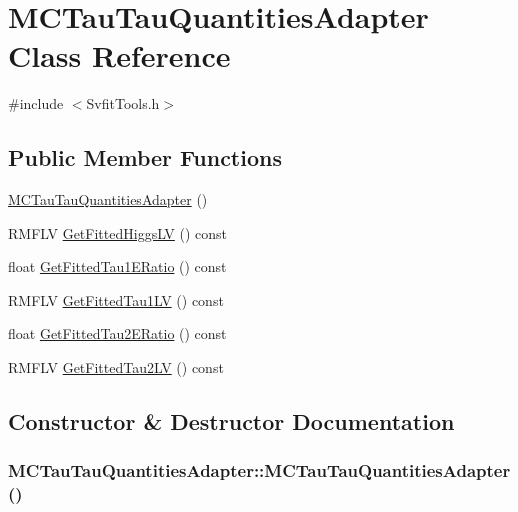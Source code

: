\hypertarget{classMCTauTauQuantitiesAdapter}{
\section{MCTauTauQuantitiesAdapter Class Reference}
\label{classMCTauTauQuantitiesAdapter}
}


{\ttfamily \#include $<$SvfitTools.h$>$}\subsection*{Public Member Functions}
\begin{DoxyCompactItemize}
\item 
\hyperlink{classMCTauTauQuantitiesAdapter_a614a45754a49329f090e9289585e110e}{MCTauTauQuantitiesAdapter} ()
\item 
RMFLV \hyperlink{classMCTauTauQuantitiesAdapter_abe749112649b074e94d21ab4d84cec87}{GetFittedHiggsLV} () const 
\item 
float \hyperlink{classMCTauTauQuantitiesAdapter_acd68faa4a6ab9608e5424f07ac55d29c}{GetFittedTau1ERatio} () const 
\item 
RMFLV \hyperlink{classMCTauTauQuantitiesAdapter_ac11aab0923f8ce008f49b929d7dd0093}{GetFittedTau1LV} () const 
\item 
float \hyperlink{classMCTauTauQuantitiesAdapter_a1a918c40f13d7999f349eb43b4613697}{GetFittedTau2ERatio} () const 
\item 
RMFLV \hyperlink{classMCTauTauQuantitiesAdapter_a209e28e3951092eb515b0111f0ef29fc}{GetFittedTau2LV} () const 
\end{DoxyCompactItemize}


\subsection{Constructor \& Destructor Documentation}
\hypertarget{classMCTauTauQuantitiesAdapter_a614a45754a49329f090e9289585e110e}{
\subsubsection[{MCTauTauQuantitiesAdapter}]{\setlength{\rightskip}{0pt plus 5cm}MCTauTauQuantitiesAdapter::MCTauTauQuantitiesAdapter ()}}
\label{classMCTauTauQuantitiesAdapter_a614a45754a49329f090e9289585e110e}


